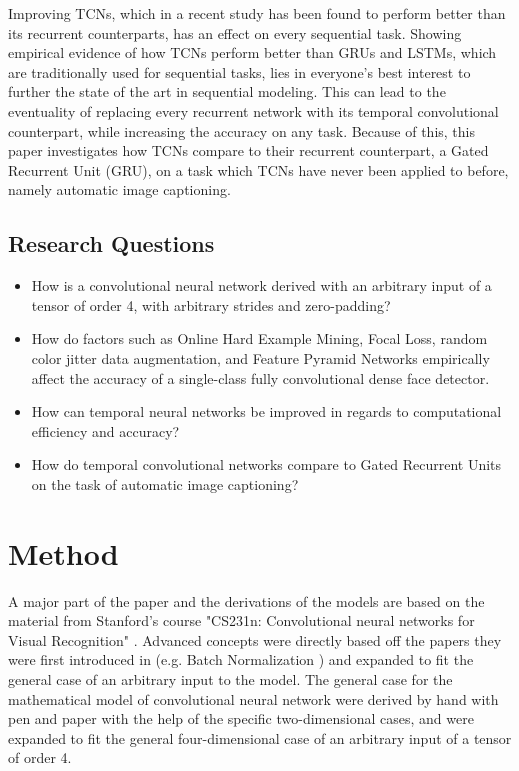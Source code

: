 \documentclass[a4paper, twoside]{article}
\begin{document}
Improving TCNs, which in a recent study \cite{tcn} has been found to perform better than its recurrent counterparts, has an effect on every sequential task. Showing empirical evidence of how TCNs perform better than GRUs and LSTMs, which are traditionally used for sequential tasks, lies in everyone's best interest to further the state of the art in sequential modeling. This can lead to the eventuality of replacing every recurrent network with its temporal convolutional counterpart, while increasing the accuracy on any task. Because of this, this paper investigates how TCNs compare to their recurrent counterpart, a Gated Recurrent Unit (GRU), on a task which TCNs have never been applied to before, namely automatic image captioning.

\subsection{Research Questions}

\begin{itemize}
\item How is a convolutional neural network derived with an arbitrary input of a tensor of order 4, with arbitrary strides and zero-padding?

\item How do factors such as Online Hard Example Mining, Focal Loss, random color jitter data augmentation, and Feature Pyramid Networks empirically affect the accuracy of a single-class fully convolutional dense face detector.

\item How can temporal neural networks be improved in regards to computational efficiency and accuracy?

\item How do temporal convolutional networks compare to Gated Recurrent Units on the task of automatic image captioning?

\end{itemize}

\section{Method}
A major part of the paper and the derivations of the models are based on the material from Stanford's course "CS231n: Convolutional neural networks for Visual Recognition" \cite{cs231n}. Advanced concepts were directly based off the papers they were first introduced in (e.g. Batch Normalization \cite{batchnorm}) and expanded to fit the general case of an arbitrary input to the model. The general case for the mathematical model of convolutional neural network were derived by hand with pen and paper with the help of the specific two-dimensional cases, and were expanded to fit the general four-dimensional case of an arbitrary input of a tensor of order 4. 
\end{document}
